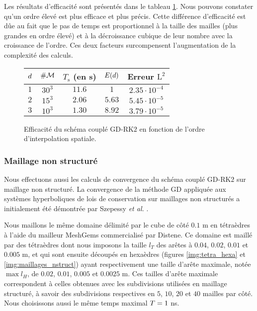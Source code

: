 Les résultats d'efficacité sont présentés dans le tableau \ref{tab:order_time_struct}.
Nous pouvons constater qu'un ordre élevé est plus efficace et plus précis.
Cette différence d'efficacité est dûe au fait que le pas de temps est proportionnel
à la taille des mailles (plus grandes en ordre élevé)
et à la décroissance cubique de leur nombre avec la croissance de l'ordre.
Ces deux facteurs surcompensent l'augmentation de la complexité des calculs.


\begin{figure}[!h]
	\begin{center}
		\caption{
			\label{tab:order_time_struct}
			Efficacité du schéma couplé GD-RK$2$
			en fonction de l'ordre d'interpolation spatiale.
		}
		
		\begin{tabular}{|c|c|c|c|c|}
			\hline
			$d$ & $\#\mathcal{M}$ & $T_\mathrm{s}$ (en s) & $E(d)$ & Erreur $\mathrm{L}^2$ \\ \hline\hline
			$1$ & $30^3$ & $11.6$ & $1$ & $2.35 \cdot 10^{-4}$ \\	\hline
			$2$ & $15^3$ & $2.06$ & $5.63$ & $5.45 \cdot 10^{-5}$ \\	\hline
			$3$ & $10^3$ & $1.30$ & $8.92$ & $3.79 \cdot 10^{-5}$ \\	\hline
		\end{tabular}
	\end{center}
\end{figure}




\subsubsection{Maillage non structuré}
\label{sssect:cv_gd_rk2_non_struct}

Nous effectuons aussi les calculs de convergence du schéma couplé GD-RK$2$
sur maillage non structuré.
La convergence de la méthode GD appliquée
aux systèmes hyperboliques de lois de conservation
sur maillages non structurés a initialement
été démontrée par Szepessy \textit{et al.} \cite{SZEPESSY1}.


Nous maillons le même domaine délimité par le cube de côté $0.1$ m
en tétraèdres à l'aide du mailleur MeshGems commercialisé par Distene.
Ce domaine est maillé par des tétraèdres dont nous imposons la taille $l_T$ des arêtes
à $0.04$, $0.02$, $0.01$ et $0.005$ m, et qui sont ensuite découpés en hexaèdres
(figures \ref{img:tetra_hexa} et \ref{img:maillages_nstruct}) ayant respectivement une taille d'arête maximale,
notée $\max l_H$,
de $0.02$, $0.01$, $0.005$ et $0.0025$ m.
Ces tailles d'arête maximale correspondent à celles obtenues avec les subdivisions utilisées
en maillage structuré, à savoir des subdivisions respectives
en $5$, $10$, $20$ et $40$ mailles par côté.
Nous choisissons aussi le même temps maximal $T = 1$ ns.


